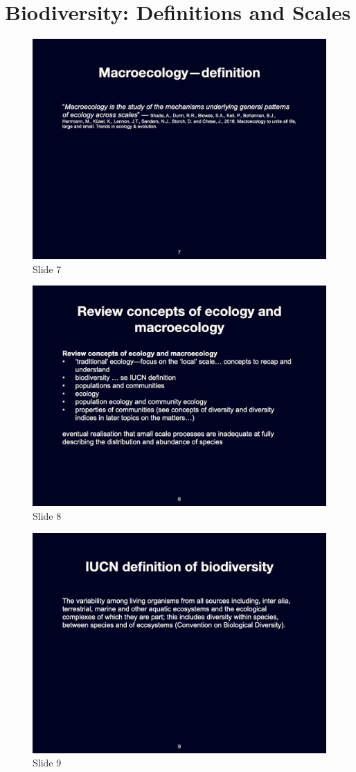 \documentclass[
  12pt,
]{book}
\begin{document}
\section{Biodiversity: Definitions and
Scales}\label{biodiversity-definitions-and-scales}

\begin{figure}[ht]
\centering
\includegraphics[width=0.8\linewidth]{../images/BDC334/BDC334-007.jpeg}
\caption*{Slide 7}
\end{figure}

\begin{figure}[ht]
\centering
\includegraphics[width=0.8\linewidth]{../images/BDC334/BDC334-008.jpeg}
\caption*{Slide 8}
\end{figure}

\begin{figure}[ht]
\centering
\includegraphics[width=0.8\linewidth]{../images/BDC334/BDC334-009.jpeg}
\caption*{Slide 9}
\end{figure}
\end{document}
